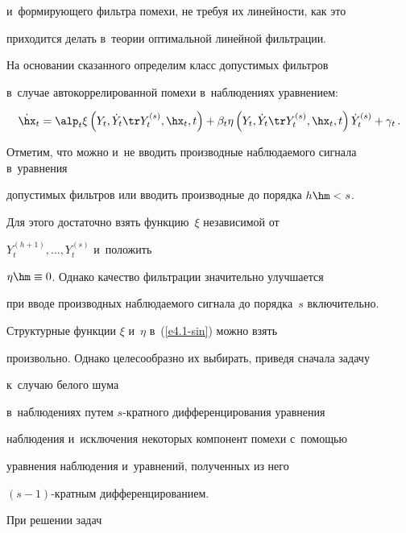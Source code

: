 и~формирующего фильтра помехи, не требуя их линейности, как это


приходится делать в~теории оптимальной линейной фильтрации.





На основании сказанного определим класс допустимых фильтров 


в~случае автокоррелированной помехи в~наблюдениях уравнением:


\begin{equation}


\dot{\hx}_t =\alp_t\xi \left(Y_t, \dot Y_t \tr Y_t^{(s)},\hx_t,t\right) 


+\beta_t\eta\left(Y_t, \dot Y_t \tr Y_t^{(s)},\hx_t,t\right) 


\dot Y_t^{(s)} +\gamma_t\,. \label{e4.1-sin}


\end{equation}





Отметим, что можно и~не вводить производные наблюдаемого сигнала в~уравнения


допустимых фильтров или вводить производные до порядка $h\hm< s$. 


Для этого достаточно взять функцию~$\xi$ независимой от


$Y_t^{(h+1)},\ldots , Y_t^{(s)}$  и~положить


$\eta\hm\equiv 0$. Однако качество фильтрации значительно улучшается


при вводе производных наблюдаемого сигнала до порядка~$s$ включительно.





Структурные функции  $\xi$ и~$\eta$ в~(\ref{e4.1-sin}) можно взять


произвольно. Однако целесообразно их выбирать, приведя сначала задачу 


к~случаю белого шума


в~наблюдениях путем $s$-крат\-но\-го дифференцирования уравнения


наблюдения и~исключения некоторых компонент помехи с~по\-мощью


уравнения наблюдения и~уравнений, полученных из него


$(s-1)$-крат\-ным дифференцированием.





При решении задач



